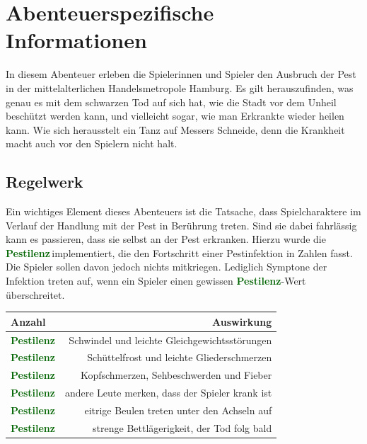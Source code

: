 
\section*{Abenteuerspezifische Informationen}

In diesem Abenteuer erleben die Spielerinnen und Spieler den Ausbruch der Pest in der
mittelalterlichen Handelsmetropole Hamburg. Es gilt herauszufinden, was genau es mit
dem schwarzen Tod auf sich hat, wie die Stadt vor dem Unheil beschützt werden kann,
und vielleicht sogar, wie man Erkrankte wieder heilen kann. Wie sich herausstelt ein
Tanz auf Messers Schneide, denn die Krankheit macht auch vor den Spielern nicht halt.

\subsection*{Regelwerk}
\label{ssec:rules}

\newcommand{\Pestilenz}[1][]{\textbf{\textcolor{darkgreen}{Pestilenz\ifthenelse{\equal{#1}{}}{}{$\;#1$}}}}

Ein wichtiges Element dieses Abenteuers ist die Tatsache, dass Spielcharaktere im
Verlauf der Handlung mit der Pest in Berührung treten. Sind sie dabei fahrlässig
kann es passieren, dass sie selbst an der Pest erkranken. Hierzu wurde die
\Pestilenz{}$\,$implementiert, die den Fortschritt einer Pestinfektion in Zahlen
fasst. Die Spieler sollen davon jedoch nichts mitkriegen. Lediglich Symptone der
Infektion treten auf, wenn ein Spieler einen gewissen \Pestilenz{}-Wert
überschreitet.

\begin{center}
\begingroup
\renewcommand{\arraystretch}{1.4}
  \begin{tabular*}{0.8\textwidth}{@{\extracolsep{\fill}} lr}
    \toprule
    Anzahl & Auswirkung \\
    \midrule
    \Pestilenz[1-2] & Schwindel und leichte Gleichgewichtsstörungen \\
    \Pestilenz[3-4] & Schüttelfrost und leichte Gliederschmerzen \\
    \Pestilenz[5-6] & Kopfschmerzen, Sehbeschwerden und Fieber \\
    \Pestilenz[7-8] & andere Leute merken, dass der Spieler krank ist \\
    \Pestilenz[9-10] & eitrige Beulen treten unter den Achseln auf \\
    \Pestilenz[>10] & strenge Bettlägerigkeit, der Tod folg bald \\
    \bottomrule
  \end{tabular*}
\endgroup
\end{center}


